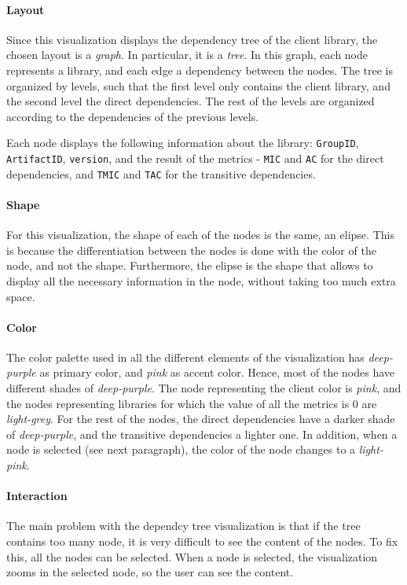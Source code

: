 \paragraph{Layout}
Since this visualization displays the dependency tree of the client library, the chosen layout is a \textit{graph}. In particular, it is a \textit{tree}. In this graph, each node represents a library, and each edge a dependency between the nodes. The tree is organized by levels, such that the first level only contains the client library, and the second level the direct dependencies. The rest of the levels are organized according to the dependencies of the previous levels.

Each node displays the following information about the library: \texttt{GroupID}, \texttt{ArtifactID}, \texttt{version}, and the result of the metrics - \texttt{MIC} and \texttt{AC} for the direct dependencies, and \texttt{TMIC} and \texttt{TAC} for the transitive dependencies.

\paragraph{Shape}
For this visualization, the shape of each of the nodes is the same, an elipse. This is because the differentiation between the nodes is done with the color of the node, and not the shape. Furthermore, the elipse is the shape that allows to display all the necessary information in the node, without taking too much extra space.

\paragraph{Color}
The color palette used in all the different elements of the visualization has \textit{deep-purple} as primary color, and \textit{pink} as accent color. Hence, most of the nodes have different shades of \textit{deep-purple}. The node representing the client color is \textit{pink}, and the nodes representing libraries for which the value of all the metrics is 0 are \textit{light-grey}. For the rest of the nodes, the direct dependencies have a darker shade of \textit{deep-purple}, and the transitive dependencies a lighter one. 
In addition, when a node is selected (see next paragraph), the color of the node changes to a \textit{light-pink}.

\paragraph{Interaction}
The main problem with the dependcy tree visualization is that if the tree contains too many node, it is very difficult to see the content of the nodes. To fix this, all the nodes can be selected. When a node is selected, the visualization zooms in the selected node, so the user can see the content.

